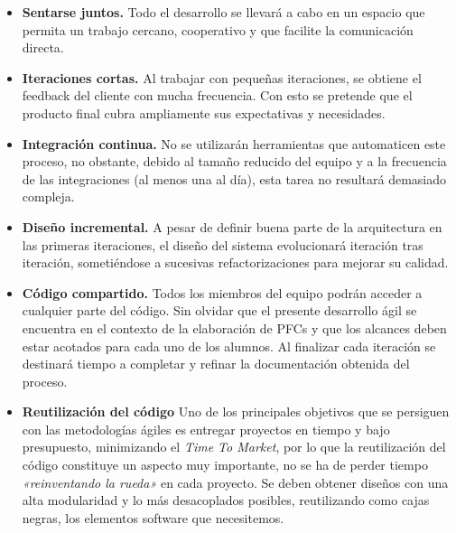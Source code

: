 \begin{itemize}
\item \textbf{Sentarse juntos.} Todo el desarrollo se llevará a cabo en un espacio que permita un trabajo cercano, cooperativo y que facilite la comunicación directa. %

\item \textbf{Iteraciones cortas.}  Al trabajar con pequeñas iteraciones, se obtiene el feedback del cliente con mucha frecuencia. Con esto se pretende que el producto final cubra ampliamente sus expectativas y necesidades. 

\item \textbf{Integración continua.} No se utilizarán herramientas que automaticen este proceso, no obstante, debido al tamaño reducido del equipo y a la frecuencia de las integraciones (al menos una al día), esta tarea no resultará demasiado compleja. 

\item \textbf{Diseño incremental.} A pesar de definir buena parte de la arquitectura en las primeras iteraciones, el diseño del sistema evolucionará iteración tras iteración, sometiéndose a sucesivas refactorizaciones para mejorar su calidad.  

\item \textbf{Código compartido.} Todos los miembros del equipo podrán acceder a cualquier parte del código. Sin olvidar que el presente desarrollo ágil se encuentra en el contexto de la elaboración de PFCs y que los alcances deben estar acotados para cada uno de los alumnos. Al finalizar cada  iteración se destinará tiempo a completar y refinar la documentación obtenida del proceso.

\item \textbf{Reutilización del código} Uno de los principales objetivos que se persiguen con las metodologías ágiles es entregar proyectos en tiempo y bajo presupuesto, minimizando el \textit{Time To Market}, por lo que la reutilización del código constituye un aspecto muy importante, no se ha de perder tiempo \textit{«reinventando la rueda»} en cada proyecto. Se deben obtener diseños con una alta modularidad y lo más desacoplados posibles, reutilizando como cajas negras, los elementos software que necesitemos. 

\end{itemize}

